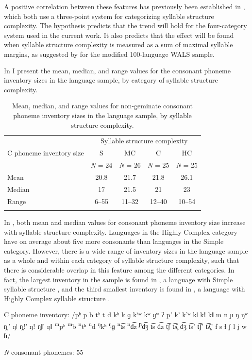   A positive correlation between these features has previously been established in \citet{Maddieson2006,Maddieson2013a}, which both use a three-point system for categorizing syllable structure complexity. The hypothesis predicts that the trend will hold for the four-category system used in the current work. It also predicts that the effect will be found when syllable structure complexity is measured as a sum of maximal syllable margins, as suggested by \citet{Gordon2016} for the modified 100-language WALS sample.

  In  I present the mean, median, and range values for the consonant phoneme inventory sizes in the language sample, by category of syllable structure complexity. 
  
\begin{table}
\begin{tabular}{lcccc}
\lsptoprule
 & \multicolumn{4}{c}{Syllable structure complexity}\\\cmidrule(lr){2-5}
C phoneme inventory size & S & MC & C & HC\\
     & \textit{N} = 24 & \textit{N} = 26 & \textit{N} = 25 & \textit{N} = 25\\\midrule
Mean & 20.8 & 21.7 & 21.8 & 26.1\\
Median & 17 & 21.5 & 21 & 23\\
Range & 6--55 & 11--32 & 12--40 & 10--54\\
\lspbottomrule
\end{tabular}
\caption{\label{tab:4.9}Mean, median, and range values for non-geminate consonant phoneme inventory sizes in the language sample, by syllable structure complexity.}
\end{table}

  In , both mean and median values for consonant phoneme inventory size increase with syllable structure complexity. Languages in the Highly Complex category have on average about five more consonants than languages in the Simple category. However, there is a wide range of inventory sizes in the language sample as a whole and within each category of syllable structure complexity, such that there is considerable overlap in this feature among the different categories. In fact, the largest inventory in the sample is found in , a language with Simple syllable structure , and the third smallest inventory is found in , a language with Highly Complex syllable structure .

\ea\label{ex:4.20}
\begin{Coding}
\item[C phoneme inventory:] /pʰ p b tʰ t d kʰ k ɡ kʰʷ kʷ ɡʷ ʔ p’ k’ k’ʷ kǀ kǃ kǁ m n ɲ ŋ ŋʷ ŋ̥ǀ’ ŋǀ ŋ̥ǃ’ ŋǃ ŋ̥ǁ’ ŋǁ \textsuperscript{m}pʰ \textsuperscript{m}b \textsuperscript{n}tʰ \textsuperscript{n}d \textsuperscript{ŋ}kʰ \textsuperscript{ŋ}ɡ \textsuperscript{n}t͡s \textsuperscript{n}d͡z \textsuperscript{ɲ}d͡ʒ t͡s d͡z t͡ʃ t͡ʎ̥ d͡ʒ t͡s’ t͡ʃ’ t͡ʎ̥’ f s ɬ ʃ l j w ɦ/

\item[\textit{N} consonant phonemes:] 55
\end{Coding}
\z

